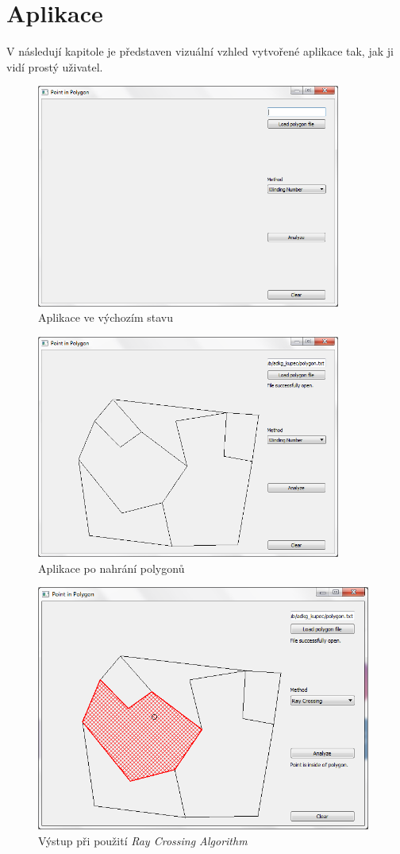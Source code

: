 \documentclass[a4paper, 12pt]{article}
\begin{document}
\section{Aplikace}
V následují kapitole je představen vizuální vzhled vytvořené aplikace tak, jak ji vidí prostý uživatel.

\begin{figure}[h!]
	\centering
	\includegraphics[width=10cm]{./pictures/gui_default.png}
	\caption{Aplikace ve výchozím stavu}
\end{figure}

\begin{figure}[h!]
	\centering
	\includegraphics[width=10cm]{./pictures/gui_load.png}
	\caption{Aplikace po nahrání polygonů}
\end{figure}

\begin{figure}[h!]
	\centering
	\includegraphics[width=11cm]{./pictures/gui_ray.png}
	\caption{Výstup při použití \textit{Ray Crossing Algorithm}}
\end{figure}
\end{document}
